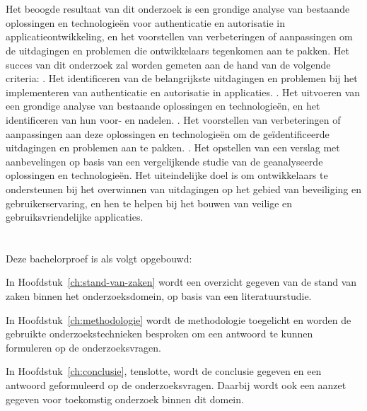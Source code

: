 \section{}%
\label{sec:onderzoeksdoelstelling}

Het beoogde resultaat van dit onderzoek is een grondige analyse van bestaande oplossingen en technologieën voor authenticatie en autorisatie in applicatieontwikkeling, en het voorstellen van 
verbeteringen of aanpassingen om de uitdagingen en problemen die ontwikkelaars tegenkomen aan te pakken. 
\newline
\newline
Het succes van dit onderzoek zal worden gemeten aan de hand van de volgende criteria:
\newline
{}. Het identificeren van de belangrijkste uitdagingen en problemen bij het implementeren van authenticatie en autorisatie in applicaties.
. Het uitvoeren van een grondige analyse van bestaande oplossingen en technologieën, en het identificeren van hun voor- en nadelen.
. Het voorstellen van verbeteringen of aanpassingen aan deze oplossingen en technologieën om de geïdentificeerde uitdagingen en problemen aan te pakken.
. Het opstellen van een verslag met aanbevelingen op basis van een vergelijkende studie van de geanalyseerde oplossingen en technologieën.
\newline
\newline
Het uiteindelijke doel is om ontwikkelaars te ondersteunen bij het overwinnen van uitdagingen op het gebied van beveiliging en gebruikerservaring, en hen te helpen bij het bouwen van veilige en 
gebruiksvriendelijke applicaties.

\section{}%
\label{sec:opzet-bachelorproef}


Deze bachelorproef is als volgt opgebouwd:

In Hoofdstuk~\ref{ch:stand-van-zaken} wordt een overzicht gegeven van de stand van zaken binnen het onderzoeksdomein, op basis van een literatuurstudie.

In Hoofdstuk~\ref{ch:methodologie} wordt de methodologie toegelicht en worden de gebruikte onderzoekstechnieken besproken om een antwoord te kunnen formuleren op de onderzoeksvragen.


In Hoofdstuk~\ref{ch:conclusie}, tenslotte, wordt de conclusie gegeven en een antwoord geformuleerd op de onderzoeksvragen. Daarbij wordt ook een aanzet gegeven voor toekomstig onderzoek binnen dit domein.